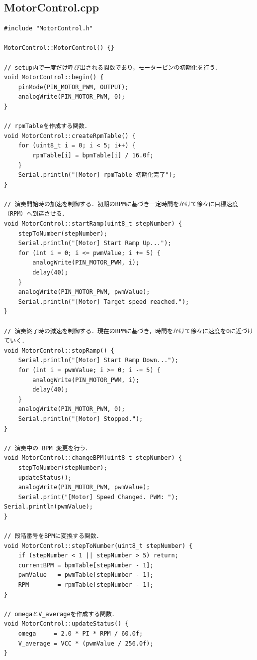 \subsection{MotorControl.cpp}
\begin{lstlisting}[caption={MotorControl.cpp}, label={lst:motor_cpp}]
#include "MotorControl.h"

MotorControl::MotorControl() {}

// setup内で一度だけ呼び出される関数であり，モーターピンの初期化を行う．
void MotorControl::begin() {
    pinMode(PIN_MOTOR_PWM, OUTPUT);
    analogWrite(PIN_MOTOR_PWM, 0);
}

// rpmTableを作成する関数．
void MotorControl::createRpmTable() {
    for (uint8_t i = 0; i < 5; i++) {
        rpmTable[i] = bpmTable[i] / 16.0f;
    }
    Serial.println("[Motor] rpmTable 初期化完了");
}

// 演奏開始時の加速を制御する．初期のBPMに基づき一定時間をかけて徐々に目標速度（RPM）へ到達させる．
void MotorControl::startRamp(uint8_t stepNumber) {
    stepToNumber(stepNumber);
    Serial.println("[Motor] Start Ramp Up...");
    for (int i = 0; i <= pwmValue; i += 5) {
        analogWrite(PIN_MOTOR_PWM, i);
        delay(40);
    }
    analogWrite(PIN_MOTOR_PWM, pwmValue);
    Serial.println("[Motor] Target speed reached.");
}

// 演奏終了時の減速を制御する．現在のBPMに基づき，時間をかけて徐々に速度を0に近づけていく．
void MotorControl::stopRamp() {
    Serial.println("[Motor] Start Ramp Down...");
    for (int i = pwmValue; i >= 0; i -= 5) {
        analogWrite(PIN_MOTOR_PWM, i);
        delay(40);
    }
    analogWrite(PIN_MOTOR_PWM, 0);
    Serial.println("[Motor] Stopped.");
}

// 演奏中の BPM 変更を行う．
void MotorControl::changeBPM(uint8_t stepNumber) {
    stepToNumber(stepNumber);
    updateStatus();
    analogWrite(PIN_MOTOR_PWM, pwmValue);
    Serial.print("[Motor] Speed Changed. PWM: "); Serial.println(pwmValue);
}

// 段階番号をBPMに変換する関数．
void MotorControl::stepToNumber(uint8_t stepNumber) {
    if (stepNumber < 1 || stepNumber > 5) return;
    currentBPM = bpmTable[stepNumber - 1];
    pwmValue   = pwmTable[stepNumber - 1];
    RPM        = rpmTable[stepNumber - 1];
}

// omegaとV_averageを作成する関数．
void MotorControl::updateStatus() {
    omega     = 2.0 * PI * RPM / 60.0f;
    V_average = VCC * (pwmValue / 256.0f);
}
\end{lstlisting}
